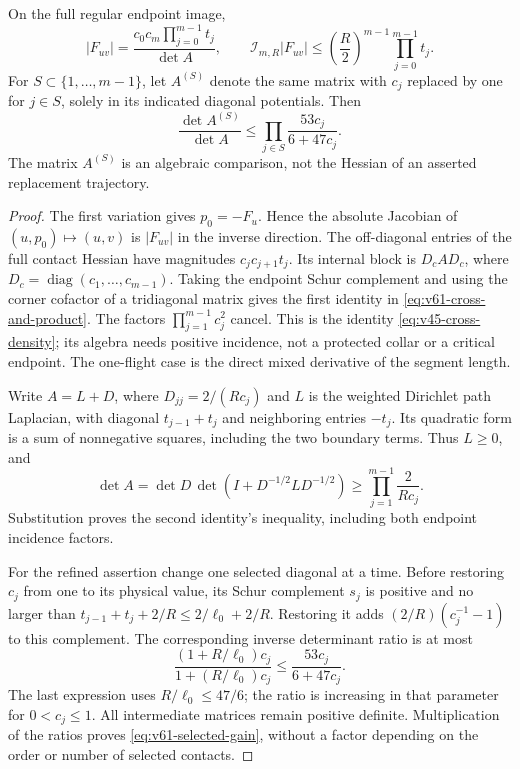 \begin{lemma}
\label{lem:v61-determinant-gain}
On the full regular endpoint image,
\begin{equation}\label{eq:v61-cross-and-product}
 |F_{uv}|=\frac{c_0c_m\prod_{j=0}^{m-1}t_j}{\det A},\qquad
 \mathcal I_{m,R}|F_{uv}|
       \le \left(\frac R2\right)^{m-1}\prod_{j=0}^{m-1}t_j.
\end{equation}
For $S\subset\{1,\ldots,m-1\}$, let $A^{(S)}$ denote the same
matrix with $c_j$ replaced by one for $j\in S$, solely in its
indicated diagonal potentials. Then
\begin{equation}\label{eq:v61-selected-gain}
 \frac{\det A^{(S)}}{\det A}
       \le\prod_{j\in S}\frac{53c_j}{6+47c_j}.
\end{equation}
The matrix $A^{(S)}$ is an algebraic comparison, not the Hessian of
an asserted replacement trajectory.
\end{lemma}
\begin{proof}
The first variation gives $p_0=-F_u$. Hence the absolute Jacobian
of $(u,p_0)\mapsto(u,v)$ is $|F_{uv}|$ in the inverse direction.
The off-diagonal entries of the full contact Hessian have magnitudes
$c_jc_{j+1}t_j$. Its internal block is $D_cAD_c$, where
$D_c=\operatorname{diag}(c_1,\ldots,c_{m-1})$. Taking the endpoint
Schur complement and using the corner cofactor of a tridiagonal
matrix gives the first identity in \eqref{eq:v61-cross-and-product}.
The factors $\prod_{j=1}^{m-1}c_j^2$ cancel. This is the identity
\eqref{eq:v45-cross-density}; its algebra needs positive incidence,
not a protected collar or a critical endpoint. The one-flight case
is the direct mixed derivative of the segment length.

Write $A=L+D$, where $D_{jj}=2/(Rc_j)$ and $L$ is the weighted
Dirichlet path Laplacian, with diagonal $t_{j-1}+t_j$ and neighboring
entries $-t_j$. Its quadratic form is a sum of nonnegative squares,
including the two boundary terms. Thus $L\ge0$, and
\[
 \det A=\det D\,\det(I+D^{-1/2}LD^{-1/2})
       \ge\prod_{j=1}^{m-1}\frac2{Rc_j}.
\]
Substitution proves the second identity's inequality, including
both endpoint incidence factors.

For the refined assertion change one selected diagonal at a time.
Before restoring $c_j$ from one to its physical value, its Schur
complement $s_j$ is positive and no larger than
$t_{j-1}+t_j+2/R\le2/\ell_0+2/R$. Restoring it adds
$(2/R)(c_j^{-1}-1)$ to this complement. The corresponding inverse
determinant ratio is at most
\[
 \frac{(1+R/\ell_0)c_j}{1+(R/\ell_0)c_j}
       \le \frac{53c_j}{6+47c_j}.
\]
The last expression uses $R/\ell_0\le47/6$; the ratio is increasing
in that parameter for $0<c_j\le1$. All intermediate matrices remain
positive definite. Multiplication of the ratios proves
\eqref{eq:v61-selected-gain}, without a factor depending on the
order or number of selected contacts.
\end{proof}

